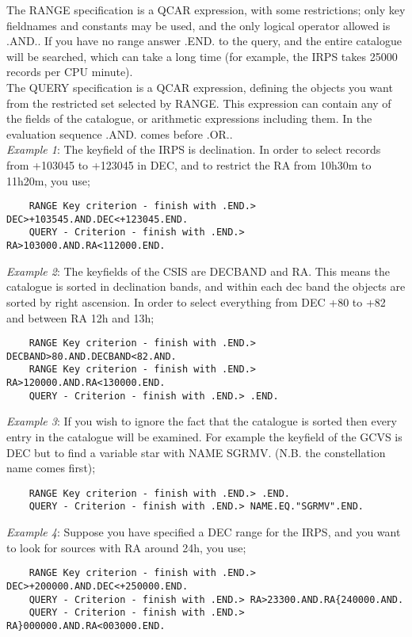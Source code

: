 The RANGE specification is a QCAR expression, with some restrictions; only
key fieldnames and constants may be used, and the only logical operator
allowed is .AND..
If you have no range answer .END. to the query, and the entire catalogue will
be searched, which can take a long time (for example, the IRPS takes 25000
records per CPU minute).\\
The QUERY specification is a QCAR expression, defining the objects you want
from the restricted set selected by RANGE.
This expression can contain any of the fields of the catalogue, or arithmetic
expressions including them.
In the evaluation sequence .AND. comes before .OR..\\
{\em Example 1}: The keyfield of the IRPS is declination.
In order to select records from +103045 to +123045 in DEC, and to restrict
the RA from 10h30m to 11h20m, you use;
\begin{verbatim}
    RANGE Key criterion - finish with .END.> DEC>+103545.AND.DEC<+123045.END.
    QUERY - Criterion - finish with .END.> RA>103000.AND.RA<112000.END.
\end{verbatim}
{\em Example 2}: The keyfields of the CSIS are DECBAND and RA.
This means the catalogue is sorted in declination bands, and within each dec
band the objects are sorted by right ascension.
In order to select everything from DEC +80 to +82 and between RA 12h and 13h;
\begin{verbatim}
    RANGE Key criterion - finish with .END.> DECBAND>80.AND.DECBAND<82.AND.
    RANGE Key criterion - finish with .END.> RA>120000.AND.RA<130000.END.
    QUERY - Criterion - finish with .END.> .END.
\end{verbatim}
{\em Example 3}: If you wish to ignore the fact that the catalogue is sorted
then every entry in the catalogue will be examined. For example the keyfield
of the GCVS is DEC but to find a variable star with NAME SGRMV.
(N.B. the constellation name comes first);
\begin{verbatim}
    RANGE Key criterion - finish with .END.> .END.
    QUERY - Criterion - finish with .END.> NAME.EQ."SGRMV".END.
\end{verbatim}
{\em Example 4}: Suppose you have specified a DEC range for the IRPS, and you
want to look for sources with RA around 24h, you use;
\begin{verbatim}
    RANGE Key criterion - finish with .END.> DEC>+200000.AND.DEC<+250000.END.
    QUERY - Criterion - finish with .END.> RA>23300.AND.RA{240000.AND.
    QUERY - Criterion - finish with .END.> RA}000000.AND.RA<003000.END.
\end{verbatim}
